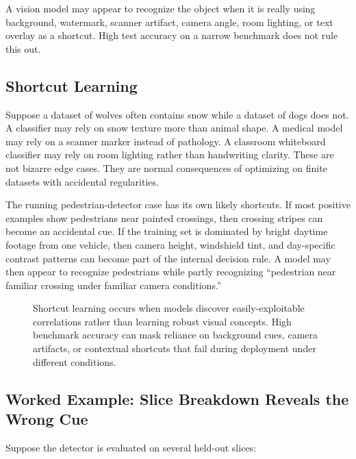 \begin{failurebox}
A vision model may appear to recognize the object when it is really using background, watermark, scanner artifact, camera angle, room lighting, or text overlay as a shortcut. High test accuracy on a narrow benchmark does not rule this out.
\end{failurebox}

\subsection{Shortcut Learning}

Suppose a dataset of wolves often contains snow while a dataset of dogs does not. A classifier may rely on snow texture more than animal shape. A medical model may rely on a scanner marker instead of pathology. A classroom whiteboard classifier may rely on room lighting rather than handwriting clarity. These are not bizarre edge cases. They are normal consequences of optimizing on finite datasets with accidental regularities.

The running pedestrian-detector case has its own likely shortcuts. If most positive examples show pedestrians near painted crossings, then crossing stripes can become an accidental cue. If the training set is dominated by bright daytime footage from one vehicle, then camera height, windshield tint, and day-specific contrast patterns can become part of the internal decision rule. A model may then appear to recognize pedestrians while partly recognizing ``pedestrian near familiar crossing under familiar camera conditions.''

\begin{figure}[t]
\centering
\resizebox{\linewidth}{!}{}
\caption{Shortcut learning occurs when models discover easily-exploitable correlations rather than learning robust visual concepts. High benchmark accuracy can mask reliance on background cues, camera artifacts, or contextual shortcuts that fail during deployment under different conditions.}
\label{fig:shortcut-learning}
\end{figure}

\subsection{Worked Example: Slice Breakdown Reveals the Wrong Cue}

Suppose the detector is evaluated on several held-out slices:

